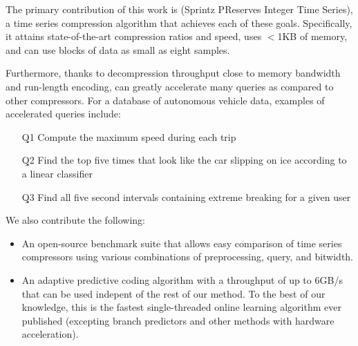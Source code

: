 The primary contribution of this work is \mine (Sprintz PReserves Integer Time Series), a time series compression algorithm that achieves each of these goals. Specifically, it attains state-of-the-art compression ratios and speed, uses $<$1KB of memory, and can use blocks of data as small as eight samples.

Furthermore, thanks to decompression throughput close to memory bandwidth and run-length encoding, \mine can greatly accelerate many queries as compared to other compressors. For a database of autonomous vehicle data, examples of accelerated queries include:


\begin{enumerate}[leftmargin=9mm]
\itemsep0mm
\item[\b{Q1}] Compute the maximum speed during each trip
\item[\b{Q2}] Find the top five times that look like the car slipping on ice according to a linear classifier
\item[\b{Q3}] Find all five second intervals containing extreme breaking for a given user
\end{enumerate}

We also contribute the following:

\begin{itemize}
\itemsep0mm
\item An open-source benchmark suite that allows easy comparison of time series compressors using various combinations of preprocessing, query, and bitwidth.
\item An adaptive predictive coding algorithm with a throughput of up to 6GB/s that can be used indepent of the rest of our method. To the best of our knowledge, this is the fastest single-threaded online learning algorithm ever published (excepting branch predictors and other methods with hardware acceleration).
\end{itemize}

